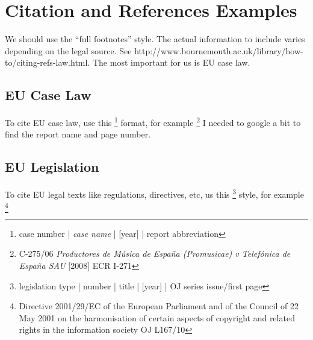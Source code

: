 \section{Citation and References Examples}

We should use the ``full footnotes'' style.  The actual information to include
varies depending on the legal source.  See
http://www.bournemouth.ac.uk/library/how-to/citing-refs-law.html. The most
important for us is EU case law.

\subsection{EU Case Law}

To cite EU case law, use this \footnote{case number | \emph{case name} | [year]
| report abbreviation} format, for example \footnote{C-275/06 \emph{Productores
de Música de España (Promusicae) v Telefónica de España SAU} [2008] ECR I-271}
I needed to google a bit to find the report name and page number.

\subsection{EU Legislation}

To cite EU legal texts like regulations, directives, etc, us this
\footnote{legislation type | number | title | [year] | OJ series issue/first
page} style, for example \footnote{Directive 2001/29/EC of the European
Parliament and of the Council of 22 May 2001 on the harmonisation of certain
aspects of copyright and related rights in the information society  OJ L167/10}
